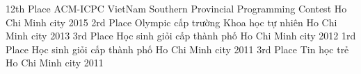 \begin{cvhonors}

   \cvhonor
    {12th Place} %
    {ACM-ICPC VietNam Southern Provincial Programming Contest} %
    {Ho Chi Minh city} %
    {2015} %
   \cvhonor
    {2rd Place} %
    {Olympic cấp trường Khoa học tự nhiên} %
    {Ho Chi Minh city} %
    {2013} %
   \cvhonor
    {3rd Place} %
    {Học sinh giỏi cấp thành phố} %
    {Ho Chi Minh city} %
    {2012} %
  \cvhonor
    {1rd Place} %
    {Học sinh giỏi cấp thành phố} %
    {Ho Chi Minh city} %
    {2011} %
  \cvhonor
    {3rd Place} %
    {Tin học trẻ} %
    {Ho Chi Minh city} %
    {2011} %


\end{cvhonors}
